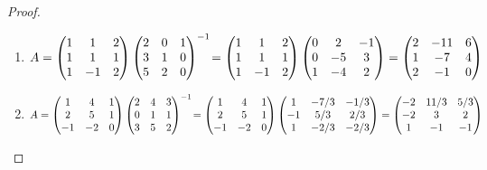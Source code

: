 \documentclass[11pt]{article}
\begin{document}
\begin{proof}
    \begin{enumerate}
        \item $$A=\begin{pmatrix}
        1&1&2\\
        1&1&1\\
        1&-1&2
    \end{pmatrix}\begin{pmatrix}
        2&0&1\\
        3&1&0\\
        5&2&0
    \end{pmatrix}^{-1}\!=\begin{pmatrix}
        1&1&2\\
        1&1&1\\
        1&-1&2
    \end{pmatrix}\begin{pmatrix}
        0 & 2 & -1 \\
        0 & -5 & 3 \\
        1 & -4 & 2 \\
    \end{pmatrix}=\begin{pmatrix}
        2 & -11 & 6 \\
        1 & -7 & 4 \\
        2 & -1 & 0 \\
    \end{pmatrix}$$
    \item $$A=\begin{pmatrix}
        1 & 4 & 1 \\
        2 & 5 & 1 \\
        -1 & -2 & 0 \\
    \end{pmatrix}\begin{pmatrix}
        2 & 4 & 3 \\
        0 & 1 & 1 \\
        3 & 5 & 2 \\
    \end{pmatrix}^{-1}\!=\begin{pmatrix}
        1 & 4 & 1 \\
        2 & 5 & 1 \\
        -1 & -2 & 0 \\
    \end{pmatrix}\begin{pmatrix}
        1 & -7/3 & -1/3 \\
        -1 & 5/3 & 2/3 \\
        1 & -2/3 & -2/3 \\
    \end{pmatrix}=\begin{pmatrix}
        -2 & 11/3 & 5/3 \\
        -2 & 3 & 2 \\
        1 & -1 & -1 \\
    \end{pmatrix}$$
    \end{enumerate}
\end{proof}
\end{document}
